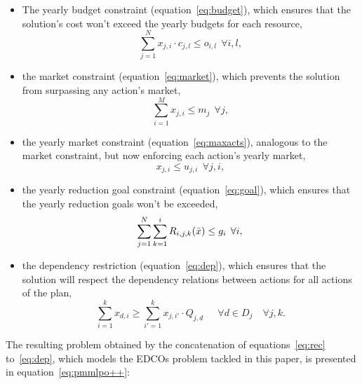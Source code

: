 \begin{itemize}
  \item The yearly budget constraint (equation~\ref{eq:budget}), which ensures that the solution's cost won't exceed the yearly budgets for each resource, 
    \begin{equation}
	\sum_{j=1}^{N} x_{j, i} \cdot c_{j,l} \le o_{i,l} \, \; \forall i, l,
	    \label{eq:budget}
    \end{equation}
  \item the market constraint (equation~\ref{eq:market}), which prevents the solution from surpassing any action's market,
    \begin{equation}
	\sum_{i=1}^{M} x_{j, i} \le m_j \, \; \forall j,
	    \label{eq:market}
    \end{equation} 
  \item the yearly market constraint (equation~\ref{eq:maxacts}), analogous to the market constraint, but now enforcing each action's yearly market,
    \begin{equation}
	x_{j, i} \le u_{j, i} \, \; \forall j, i,
	    \label{eq:maxacts}
    \end{equation} 
  \item  the yearly reduction goal constraint (equation~\ref{eq:goal}), which ensures that the yearly reduction goals won't be exceeded,
    \begin{equation}
	\label{eq:goal}
	\sum_{j=1}^{N} \sum_{k=1}^{i}R_{i,j,k}(\bar{x}) \leq g_i \, \; \forall i, \\
    \end{equation} 
  \item the dependency restriction (equation~\ref{eq:dep}), which ensures that the solution will respect the dependency relations between actions for all actions of the plan,
    \begin{equation}
	\label{eq:dep}
	\sum_{i=1}^{k} x_{d, i} \ge \sum_{i'=1}^{k} x_{j, i'} \cdot Q_{j, d} \, \; \quad \forall d \in D_j \quad \forall j,k.
    \end{equation}
\end{itemize}

The resulting problem obtained by the concatenation of equations~\ref{eq:rec} to~\ref{eq:dep}, which models the EDCOs problem tackled in this paper, is presented in equation~\ref{eq:pmmlpo++}:

